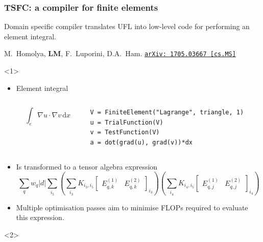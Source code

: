 \documentclass[presentation]{beamer}
\newcommand{\arxivlink}[2]{%
  \href{http://www.arxiv.org/abs/#1}%
  {\texttt{arXiv:\,#1\,[#2]}}%
}
\begin{document}
\begin{frame}[fragile]
  \frametitle{TSFC: a compiler for finite elements}
  Domain specific compiler translates UFL into
  low-level code for performing an element integral.
  \begin{flushright}
    {\scriptsize M.~Homolya, \textbf{LM}, F.~Luporini, D.A.~Ham. \arxivlink{1705.03667}{cs.MS}}
  \end{flushright}
  \begin{overlayarea}{\textwidth}{0.8\textheight}
  \begin{onlyenv}<1> 
    \begin{itemize}
    \item Element integral
      \begin{columns}
        \begin{column}{0.4\textwidth}
          \begin{equation*}
            \int_e \nabla u \cdot \nabla v\,\text{d}x
          \end{equation*}
        \end{column}
        \hspace{-3em}
        \begin{column}{0.6\textwidth}
\begin{verbatim}
V = FiniteElement("Lagrange", triangle, 1)
u = TrialFunction(V)
v = TestFunction(V)
a = dot(grad(u), grad(v))*dx
\end{verbatim}
        \end{column}
      \end{columns}
    \item Is transformed to a tensor algebra expression
      {\small \begin{equation*}
    \sum_q w_q \left| d \right| \sum_{i_5} \left( \sum_{i_3}
      K_{i_3,i_5} \begin{bmatrix}
        E^{(1)}_{q,k} & E^{(2)}_{q,k}
      \end{bmatrix}_{i_3} \right)
    \left( \sum_{i_4} K_{i_4,i_5} \begin{bmatrix}
        E^{(1)}_{q,j} & E^{(2)}_{q,j}
      \end{bmatrix}_{i_4} \right)
  \end{equation*}}
\item Multiple optimisation passes aim to minimise FLOPs required to
  evaluate this expression.
    \end{itemize}
  \end{onlyenv}
  \begin{onlyenv}<2>
    \begin{columns}

\end{columns}
\end{onlyenv}
\end{overlayarea}
\end{frame}
\end{document}
